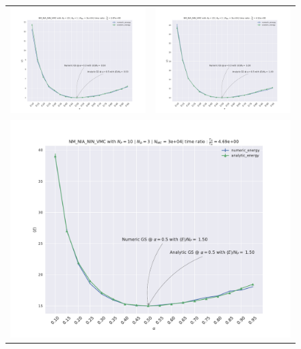 \begin{figure}
\hspace{-2.8cm}
\begin{tabular}{cc}
\includegraphics[width = 0.5\paperwidth]{figures/NM_NIA_NIN_np_10_nd_1.pdf} & \includegraphics[width = 0.5\paperwidth]{figures/NM_NIA_NIN_np_10_nd_2.pdf} \\
\multicolumn{2}{c}{\includegraphics[width=0.5\paperwidth]{figures/NM_NIA_NIN_np_10_nd_3.pdf} }

\end{tabular}
\end{figure}
